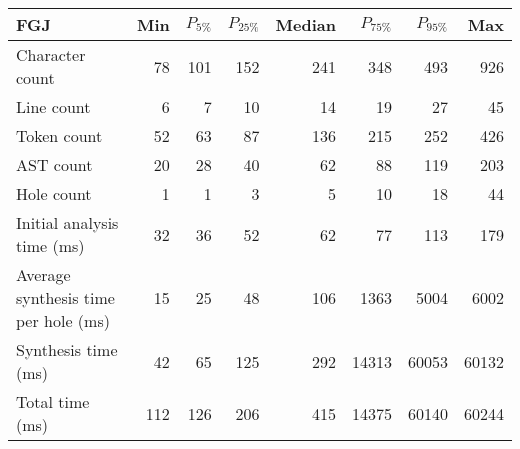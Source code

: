 \begin{tabular}{|l|r|r|r|r|r|r|r|}
  \hline
  FGJ & Min & $P_{5\%}$ & $P_{25\%}$ & Median & $P_{75\%}$ & $P_{95\%}$ & Max \\
  \hline
  \hline
  Character count & 78 & 101 & 152 & 241 & 348 & 493 & 926 \\
  Line count & 6 & 7 & 10 & 14 & 19 & 27 & 45 \\
  Token count & 52 & 63 & 87 & 136 & 215 & 252 & 426 \\
  AST count & 20 & 28 & 40 & 62 & 88 & 119 & 203 \\
  Hole count & 1 & 1 & 3 & 5 & 10 & 18 & 44 \\
  \hline
  Initial analysis time (ms) & 32 & 36 & 52 & 62 & 77 & 113 & 179 \\
  Average synthesis time per hole (ms) & 15 & 25 & 48 & 106 & 1363 & 5004 & 6002 \\
  Synthesis time (ms) & 42 & 65 & 125 & 292 & 14313 & 60053 & 60132 \\
  Total time (ms) & 112 & 126 & 206 & 415 & 14375 & 60140 & 60244 \\
  \hline
\end{tabular}